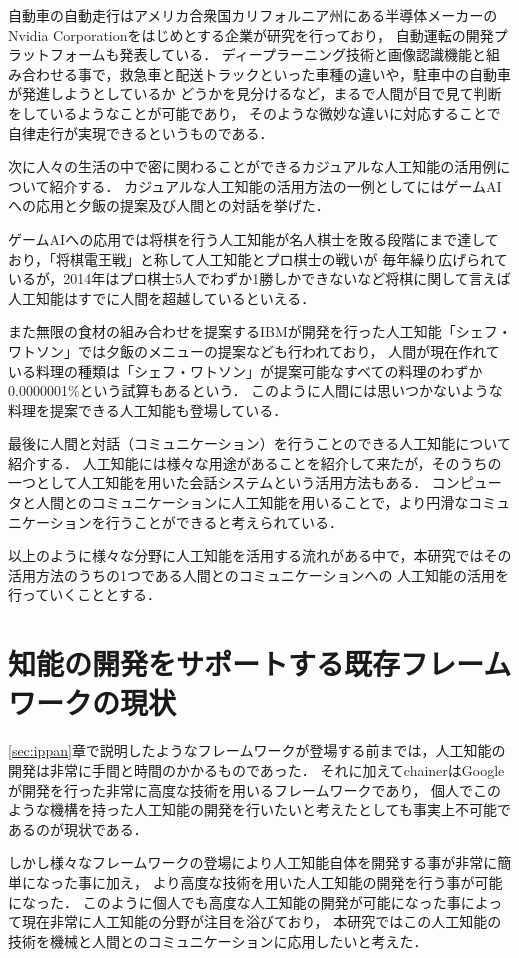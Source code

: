 自動車の自動走行はアメリカ合衆国カリフォルニア州にある半導体メーカーのNvidia Corporationをはじめとする企業が研究を行っており，
自動運転の開発プラットフォームも発表している．
ディープラーニング技術と画像認識機能と組み合わせる事で，救急車と配送トラックといった車種の違いや，駐車中の自動車が発進しようとしているか
どうかを見分けるなど，まるで人間が目で見て判断をしているようなことが可能であり，
そのような微妙な違いに対応することで自律走行が実現できるというものである．

次に人々の生活の中で密に関わることができるカジュアルな人工知能の活用例について紹介する．
カジュアルな人工知能の活用方法の一例としてにはゲームAIへの応用と夕飯の提案及び人間との対話を挙げた．

ゲームAIへの応用では将棋を行う人工知能が名人棋士を敗る段階にまで達しており，「将棋電王戦」と称して人工知能とプロ棋士の戦いが
毎年繰り広げられているが，2014年はプロ棋士5人でわずか1勝しかできないなど将棋に関して言えば人工知能はすでに人間を超越しているといえる．

また無限の食材の組み合わせを提案するIBMが開発を行った人工知能「シェフ・ワトソン」では夕飯のメニューの提案なども行われており，
人間が現在作れている料理の種類は「シェフ・ワトソン」が提案可能なすべての料理のわずか0.0000001\%という試算もあるという．
このように人間には思いつかないような料理を提案できる人工知能も登場している．

最後に人間と対話（コミュニケーション）を行うことのできる人工知能について紹介する．
人工知能には様々な用途があることを紹介して来たが，そのうちの一つとして人工知能を用いた会話システムという活用方法もある．
コンピュータと人間とのコミュニケーションに人工知能を用いることで，より円滑なコミュニケーションを行うことができると考えられている．

以上のように様々な分野に人工知能を活用する流れがある中で，本研究ではその活用方法のうちの1つである人間とのコミュニケーションへの
人工知能の活用を行っていくこととする．

\section{知能の開発をサポートする既存フレームワークの現状}
\ref{sec:ippan}章で説明したようなフレームワークが登場する前までは，人工知能の開発は非常に手間と時間のかかるものであった．
それに加えてchainerはGoogleが開発を行った非常に高度な技術を用いるフレームワークであり，
個人でこのような機構を持った人工知能の開発を行いたいと考えたとしても事実上不可能であるのが現状である．

しかし様々なフレームワークの登場により人工知能自体を開発する事が非常に簡単になった事に加え，
より高度な技術を用いた人工知能の開発を行う事が可能になった．
このように個人でも高度な人工知能の開発が可能になった事によって現在非常に人工知能の分野が注目を浴びており，
本研究ではこの人工知能の技術を機械と人間とのコミュニケーションに応用したいと考えた．

